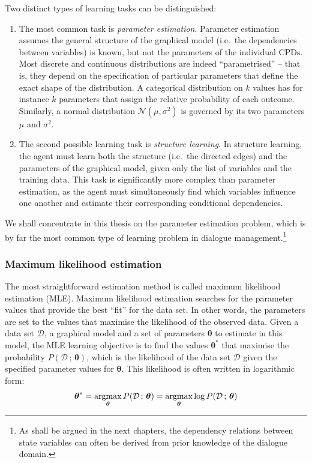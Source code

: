 Two distinct types of learning tasks can be distinguished:
\begin{enumerate}
\item The most common task is \textit{parameter estimation}.  Parameter estimation assumes the general structure of the graphical model (i.e.\ the dependencies between variables) is known, but not the parameters of the individual CPDs. Most discrete and continuous distributions are indeed ``parametrised'' -- that is, they depend on the specification of particular parameters that define the exact shape of the distribution. A categorical distribution on $k$ values has for instance $k$ parameters that assign the relative probability of each outcome.  Similarly, a normal distribution $\mathcal{N}(\mu,\sigma^2)$ is governed by its two parameters $\mu$ and $\sigma^2$. 

\item The second possible learning task is \textit{structure learning}.  In structure learning, the agent must learn both the structure (i.e.\ the directed edges) and the parameters of the graphical model, given only the list of variables and the training data.  This task is significantly more complex than parameter estimation, as the agent must simultaneously find which variables influence one another and estimate their corresponding conditional dependencies. 
\end{enumerate}

We shall concentrate in this thesis on the parameter estimation problem, which is by far the most common type of learning problem in dialogue management.\footnote{As shall be argued in the next chapters, the dependency relations between state variables can often be derived from prior knowledge of the dialogue domain.}

\subsubsection*{Maximum likelihood estimation}
The most straightforward estimation method is called maximum likelihood estimation (MLE). Maximum likelihood estimation searches for the parameter values that provide the best ``fit'' for the data set.  In other words, the parameters are set to the values that maximise the likelihood of the observed data.  Given a data set $\mathcal{D}$, a graphical model and a set of parameters $\boldsymbol\theta$ to estimate in this model, the MLE learning objective is to find the values $\boldsymbol\theta^*$  that maximise the probability $P(\mathcal{D} \, ;  \, \boldsymbol\theta)$, which is the likelihood of the data set $\mathcal{D}$ given the specified parameter values for $\boldsymbol\theta$. This likelihood is often written in logarithmic form: 
\begin{equation}
\boldsymbol\theta^* = \argmax_{\boldsymbol\theta} P(\mathcal{D}  \, ; \, \boldsymbol\theta) = \argmax_{\boldsymbol\theta} \log P(\mathcal{D}  \,  ;  \, \boldsymbol\theta)
\end{equation}

